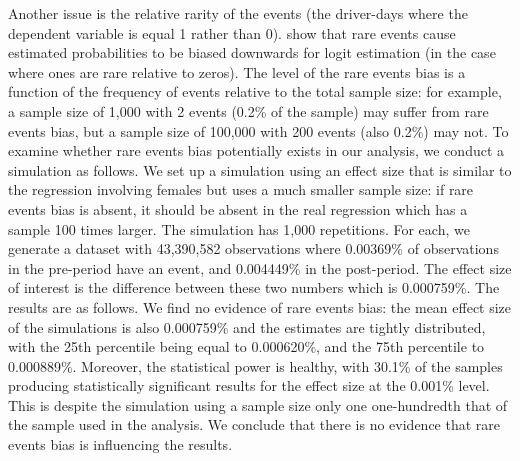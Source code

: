 Another issue is the relative rarity of the events (the driver-days where the dependent variable is equal 1 rather than 0). 
\citet{kingzheng2001}
show that rare events cause estimated probabilities to be biased downwards for logit estimation (in the case where ones are rare relative to zeros). The level of the rare events bias is a function of the frequency of events relative to the total sample size: for example, a sample size of 1,000 with 2 events (0.2\% of the sample) may suffer from rare events bias, but a sample size of 100,000 with 200 events (also 0.2\%) may not. To examine whether rare events bias potentially exists in our analysis, we conduct a simulation as follows. We set up a simulation using an effect size that is similar to the regression involving females but uses a much smaller sample size: if rare events bias is absent, it should be absent in the real regression which has a sample 100 times larger. The simulation has 1,000 repetitions. For each, we generate a dataset with 43,390,582 observations where 0.00369\% of observations in the pre-period have an event, and 0.004449\% in the post-period. The effect size of interest is the difference between these two numbers which is 0.000759\%. The results are as follows. We find no evidence of rare events bias: the mean effect size of the simulations is also 0.000759\% and the estimates are tightly distributed, with the 25th percentile being equal to 0.000620\%, and the 75th percentile to 0.000889\%. Moreover, the statistical power is healthy, with 30.1\% of the samples producing statistically significant results for the effect size at the 0.001\% level. This is despite the simulation using a sample size only one one-hundredth that of the sample used in the analysis. We conclude that there is no evidence that rare events bias is influencing the results.

